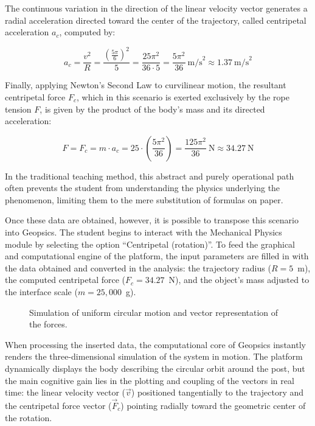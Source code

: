 \documentclass[conference,a4paper]{IEEEtran}
\begin{document}
The continuous variation in the direction of the linear velocity vector generates a radial acceleration directed toward the center of the trajectory, called centripetal acceleration $a_c$, computed by:

\begin{equation*}
a_c = \frac{v^2}{R} = \frac{\left(\tfrac{5\pi}{6}\right)^2}{5} = \frac{25\pi^2}{36\cdot 5} = \frac{5\pi^2}{36}~\text{m/s}^2 \approx 1.37~\text{m/s}^2
\end{equation*}

Finally, applying Newton's Second Law to curvilinear motion, the resultant centripetal force $F_c$, which in this scenario is exerted exclusively by the rope tension $F$, is given by the product of the body's mass and its directed acceleration:

\begin{equation*}
F = F_c = m \cdot a_c = 25 \cdot \left(\frac{5\pi^2}{36}\right) = \frac{125\pi^2}{36}~\text{N} \approx 34.27~\text{N}
\end{equation*}

In the traditional teaching method, this abstract and purely operational path often prevents the student from understanding the physics underlying the phenomenon, limiting them to the mere substitution of formulas on paper.

Once these data are obtained, however, it is possible to transpose this scenario into Geopsics. The student begins to interact with the Mechanical Physics module by selecting the option ``Centripetal (rotation)''. To feed the graphical and computational engine of the platform, the input parameters are filled in with the data obtained and converted in the analysis: the trajectory radius ($R = 5$~m), the computed centripetal force ($F_c = 34.27$~N), and the object's mass adjusted to the interface scale ($m = 25{,}000$~g).

\begin{figure}[h]
\centering
{}
\caption{Simulation of uniform circular motion and vector representation of the forces.}
\label{fig:ucm}
\end{figure}

When processing the inserted data, the computational core of Geopsics instantly renders the three-dimensional simulation of the system in motion. The platform dynamically displays the body describing the circular orbit around the post, but the main cognitive gain lies in the plotting and coupling of the vectors in real time: the linear velocity vector ($\vec{v}$) positioned tangentially to the trajectory and the centripetal force vector ($\vec{F}_c$) pointing radially toward the geometric center of the rotation.
\end{document}
